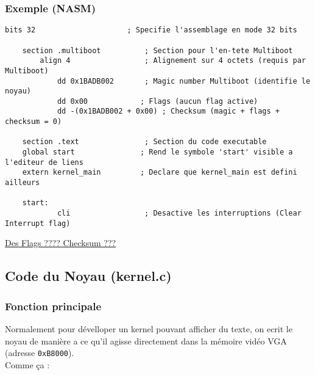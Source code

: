 \documentclass{article}
\begin{document}
\subsubsection*{Exemple (NASM)}
\begin{lstlisting}[language=assembler]
    bits 32                     ; Specifie l'assemblage en mode 32 bits

    section .multiboot          ; Section pour l'en-tete Multiboot
        align 4                 ; Alignement sur 4 octets (requis par Multiboot)
            dd 0x1BADB002       ; Magic number Multiboot (identifie le noyau)
            dd 0x00            ; Flags (aucun flag active)
            dd -(0x1BADB002 + 0x00) ; Checksum (magic + flags + checksum = 0)
    
    section .text               ; Section du code executable
    global start               ; Rend le symbole 'start' visible a l'editeur de liens
    extern kernel_main         ; Declare que kernel_main est defini ailleurs
    
    start:
            cli                 ; Desactive les interruptions (Clear Interrupt flag)
\end{lstlisting}
\hyperref[fig:flags]{Des Flags ???? Checksum ???}
\subsection*{Code du Noyau (kernel.c)}
\subsubsection*{Fonction principale}
Normalement pour dévelloper un kernel pouvant afficher du texte, on ecrit le noyau de manière a ce qu'il agisse directement dans la mémoire vidéo VGA (adresse \texttt{0xB8000}).\\ Comme ça :
\end{document}
